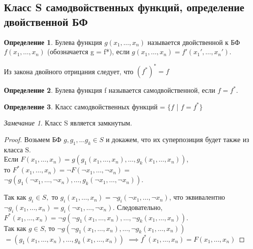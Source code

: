 \documentclass[a4paper]{article}
\theoremstyle{definition}
\newtheorem*{definition}{Определение}
\theoremstyle{remark}
\newtheorem*{remark}{Замечание}
\begin{document}
    \subsection{Класс S самодвойственных функций, определение двойственной БФ}
    \begin{definition}
        Булева функция $g(x_1, \dots, x_n)$ называется двойственной к БФ $f(x_1, \dots, x_n)$
        (обозначается g = f*), если $g(x_1, \dots, x_n) = f'(x_1', \dots, x_n')$.
    \end{definition}
    Из закона двойного отрицания следует, что $(f^*)^* = f$
    \begin{definition}
        Булева функция f называется самодвойственной, если $f = f^*$.
    \end{definition}
    \begin{definition}
        Класс самодвойственных функций = $\{f$ | $f = f^*\}$
    \end{definition}
    \begin{remark}
        Класс S является замкнутым.
    \end{remark}
    \begin{proof}
        Возьмем БФ $g, g_1, \dots g_k \in S$ и докажем, что их
        суперпозиция будет также из класса S. \\
        Если $F(x_1, \dots, x_n) = g(g_1(x_1, \dots, x_n), \dots, g_k(x_1, \dots, x_n))$,\\
        то $F^*(x_1, \dots, x_n) = \neg F(\neg x_1, \dots, \neg x_n) = $
        $\neg g(g_1(\neg x_1, \dots, \neg x_n), \dots, g_k(\neg x_1, \dots, \neg x_n))$.

        Так как $g_i \in S,$ то $g_i(x_1, \dots, x_n) = \neg g_i(\neg x_1, \dots, \neg x_n)$,
        что эквивалентно $ \neg g_i(x_1, \dots, x_n) = g_i(\neg x_1, \dots, \neg x_n)$.
        Следовательно, $F^*(x_1, \dots, x_n) = \neg g(\neg g_1(x_1, \dots, x_n), \dots, \neg g_k (x_1, \dots, x_n))$.\\
        Так как $g\in S$, то $\neg g(\neg g_1(x_1, \dots, x_n), \dots, \neg g_k (x_1, \dots, x_n))$
        $= (g_1(x_1, \dots, x_n), \dots, g_k(x_1, \dots, x_n))$
        $\implies f^*(x_1, \dots, x_n) = F(x_1, \dots, x_n)$
    \end{proof}
\end{document}
